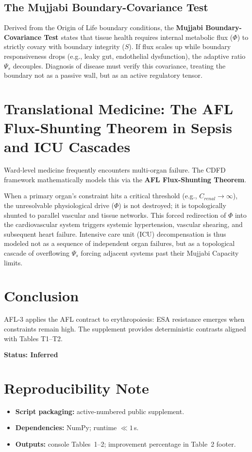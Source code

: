 \documentclass[11pt]{article}
\begin{document}
\subsection{The Mujjabi Boundary-Covariance Test \cite{MujjabiPartII2026}}
Derived from the Origin of Life boundary conditions, the \textbf{Mujjabi Boundary-Covariance Test \cite{MujjabiPartII2026}} states that tissue health requires internal metabolic flux ($\Phi$) to strictly covary with boundary integrity ($S$). If flux scales up while boundary responsiveness drops (e.g., leaky gut, endothelial dysfunction), the adaptive ratio $\Psi_s$ decouples. Diagnosis of disease must verify this covariance, treating the boundary not as a passive wall, but as an active regulatory tensor.



\section{Translational Medicine: The AFL Flux-Shunting Theorem in Sepsis and ICU Cascades}
Ward-level medicine frequently encounters multi-organ failure. The CDFD framework mathematically models this via the \textbf{AFL Flux-Shunting Theorem}. 

When a primary organ's constraint hits a critical threshold (e.g., $C_{renal} \to \infty$), the unresolvable physiological drive ($\Phi$) is not destroyed; it is topologically shunted to parallel vascular and tissue networks. This forced redirection of $\Phi$ into the cardiovascular system triggers systemic hypertension, vascular shearing, and subsequent heart failure. Intensive care unit (ICU) decompensation is thus modeled not as a sequence of independent organ failures, but as a topological cascade of overflowing $\Psi_s$ forcing adjacent systems past their Mujjabi Capacity limits.

\section{Conclusion}
AFL-3 applies the AFL contract to erythropoiesis: ESA resistance emerges when constraints remain high. The supplement provides deterministic contrasts aligned with Tables T1--T2.

\textbf{Status: Inferred}

\section{Reproducibility Note}
\begin{itemize}
  \item \textbf{Script packaging:} active-numbered public supplement.
  \item \textbf{Dependencies:} NumPy; runtime $\ll 1$\,s.
  \item \textbf{Outputs:} console Tables~1--2; improvement percentage in Table~2 footer.
\end{itemize}
\end{document}
